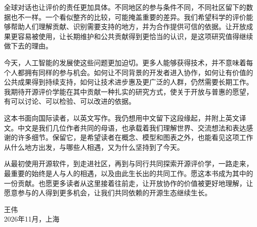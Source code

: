 全球对话也让评价的责任更加具体。不同地区的参与条件不同，不同社区留下的数据也不一样。一个看似整齐的比较，可能掩盖重要的差异。我们希望科学的评价能够帮助人们理解贡献、识别需要支持的地方，并为合作提供可信的依据。让开放成果更容易被使用，让长期维护和公共贡献得到更恰当的认识，是这项研究值得继续做下去的理由。

今天，人工智能的发展使这些问题更加迫切。更多人能够获得技术，并不意味着每个人都拥有同样的参与机会。如何让不同背景的开发者进入协作，如何让有价值的公共成果得到持续支持，如何让技术进步惠及更广泛的人群，仍然需要长期工作。我期待开源评价学能在其中贡献一种扎实的研究方式，使关于开放与普惠的愿望，有可以讨论、可以检验、可以改进的依据。

这本书面向国际读者，以英文写作。我仍想用中文留下这段缘起，并附上英文译文。中文是我们几位作者共同的母语，也承载着我们理解世界、交流想法和表达感谢的许多细节。保留它，是希望读者在概念、模型和图表之外，也能看见这项工作从什么地方出发，与哪些人相遇，又为什么坚持到了今天。

从最初使用开源软件，到走进社区，再到与同行共同探索开源评价学，一路走来，最重要的始终是人与人的相遇，以及由此生长出的共同工作。愿这本书成为其中的一份贡献。也愿更多读者从这里接着往前走，让开放协作的价值被更好地理解，让愿意参与的人得到更多机会，让我们共同依赖的开源生态继续生长。

\par\vspace{12pt}\begin{flushright}\ChineseBody 王伟\\2026年11月，上海\end{flushright}
\clearpage\endgroup

